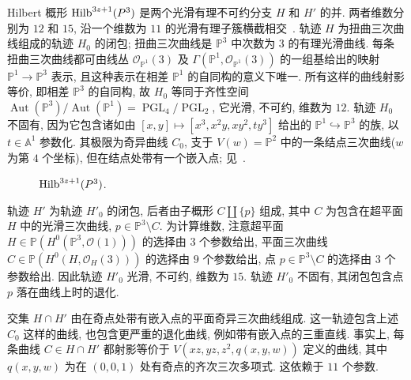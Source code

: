 \begin{example}[扭曲三次曲线]\label{src:2.5.4}
Hilbert 概形 $\operatorname{Hilb}^{3z+1}(P^3)$ 是两个光滑有理不可约分支 $H$ 和 $H'$ 的并.
两者维数分别为 $12$ 和 $15$, 沿一个维数为 $11$ 的光滑有理子簇横截相交~\cite{PS85}.
轨迹 $H$ 为扭曲三次曲线组成的轨迹 $H_0$ 的闭包; 扭曲三次曲线是 $\mathbb P^3$ 中次数为 $3$ 的有理光滑曲线.
每条扭曲三次曲线都可由线丛 $\mathcal O_{\mathbb P^1}(3)$ 及
$\Gamma(\mathbb P^1,\mathcal O_{\mathbb P^1}(3))$ 的一组基给出的映射 $\mathbb P^1\to\mathbb P^3$ 表示, 且这种表示在相差 $\mathbb P^1$ 的自同构的意义下唯一.
所有这样的曲线射影等价, 即相差 $\mathbb P^3$ 的自同构, 故 $H_0$ 等同于齐性空间
$\operatorname{Aut}(\mathbb P^3)/\operatorname{Aut}(\mathbb P^1)
=\operatorname{PGL}_4/\operatorname{PGL}_2$, 
它光滑, 不可约, 维数为 $12$.
轨迹 $H_0$ 不固有, 因为它包含诸如由
$[x,y]\mapsto[x^3,x^2y,xy^2,ty^3]$
给出的 $\mathbb P^1\hookrightarrow\mathbb P^3$ 的族, 以 $t\in\mathbb A^1$ 参数化.
其极限为奇异曲线 $C_0$, 支于 $V(w)=\mathbb P^2$ 中的一条结点三次曲线($w$ 为第 $4$ 个坐标), 但在结点处带有一个嵌入点; 见~\cite[例 $9.8.4$]{Har77}.
\begin{figure}[H]
\centering
\caption{$\operatorname{Hilb}^{3z+1}(P^3)$.}\label{src:2.5.5}
\end{figure}
轨迹 $H'$ 为轨迹 $H'_0$ 的闭包, 后者由子概形 $C\amalg\{p\}$ 组成, 其中 $C$ 为包含在超平面 $H$ 中的光滑三次曲线, $p\in\mathbb P^3\setminus C$.
为计算维数, 注意超平面 $H\in\mathbb P(H^0(\mathbb P^3,\mathcal O(1)))$ 的选择由 $3$ 个参数给出, 平面三次曲线 $C\in\mathbb P(H^0(H,\mathcal O_H(3)))$ 的选择由 $9$ 个参数给出, 点 $p\in\mathbb P^3\setminus C$ 的选择由 $3$ 个参数给出.
因此轨迹 $H'_0$ 光滑, 不可约, 维数为 $15$.
轨迹 $H'_0$ 不固有, 其闭包包含点 $p$ 落在曲线上时的退化.

交集 $H\cap H'$ 由在奇点处带有嵌入点的平面奇异三次曲线组成.
这一轨迹包含上述 $C_0$ 这样的曲线, 也包含更严重的退化曲线, 例如带有嵌入点的三重直线.
事实上, 每条曲线 $C\in H\cap H'$ 都射影等价于
$V(xz,yz,z^2,q(x,y,w))$ 定义的曲线, 其中 $q(x,y,w)$ 为在 $(0,0,1)$ 处有奇点的齐次三次多项式.
这依赖于 $11$ 个参数.
\end{example}
